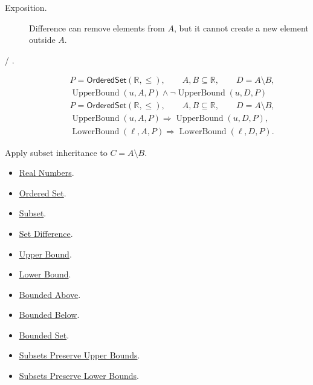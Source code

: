 \begin{remark*}
\begin{description}
\item[Exposition.]
Difference can remove elements from $A$, but it cannot create a new element
outside $A$.


  \item[ / .]

\[
\begin{aligned}
&P=\mathsf{OrderedSet}(\mathbb{R},\leq),\qquad A,B\subseteq\mathbb{R},\qquad D=A\setminus B,\\
&\operatorname{UpperBound}(u,A,P)\land
\neg\operatorname{UpperBound}(u,D,P)
\end{aligned}
\]
\[
\begin{aligned}
&P=\mathsf{OrderedSet}(\mathbb{R},\leq),\qquad A,B\subseteq\mathbb{R},\qquad D=A\setminus B,\\
&\operatorname{UpperBound}(u,A,P)\Longrightarrow\operatorname{UpperBound}(u,D,P),\\
&\operatorname{LowerBound}(\ell,A,P)\Longrightarrow\operatorname{LowerBound}(\ell,D,P).
\end{aligned}
\]
\end{description}
\end{remark*}

\begin{remark*}[Interpretation]
Apply subset inheritance to $C=A\setminus B$.
\end{remark*}

\begin{dependencies}
\begin{itemize}
\item \hyperref[def:reals]{Real Numbers}.
\item \hyperref[def:ordered-set]{Ordered Set}.
\item \hyperref[def:subset]{Subset}.
\item \hyperref[def:set-difference]{Set Difference}.
\item \hyperref[def:real-upper-bound]{Upper Bound}.
\item \hyperref[def:real-lower-bound]{Lower Bound}.
\item \hyperref[def:bounded-above]{Bounded Above}.
\item \hyperref[def:bounded-below]{Bounded Below}.
\item \hyperref[def:bounded]{Bounded Set}.
\item \hyperref[lem:subsets-preserve-upper-bounds]{Subsets Preserve Upper Bounds}.
\item \hyperref[lem:subsets-preserve-lower-bounds]{Subsets Preserve Lower Bounds}.
\end{itemize}
\end{dependencies}

